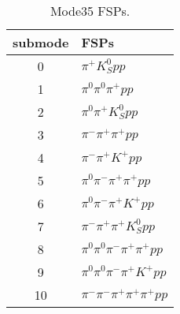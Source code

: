 \begin{table}[h!]
\begin{center}
\begin{tabular}{cl}
\hline
submode& FSPs\\
\hline
0 & $\pi^+ K_S^0 {p} p $ \\
1 & $\pi^0 \pi^0 \pi^+ {p} p $ \\
2 & $\pi^0 \pi^+ K_S^0 {p} p $ \\
3 & $\pi^- \pi^+ \pi^+ {p} p $ \\
4 & $\pi^- \pi^+ K^+ {p} p $ \\
5 & $\pi^0 \pi^- \pi^+ \pi^+ {p} p $ \\
6 & $\pi^0 \pi^- \pi^+ K^+ {p} p $ \\
7 & $\pi^- \pi^+ \pi^+ K_S^0 {p} p $ \\
8 & $\pi^0 \pi^0 \pi^- \pi^+ \pi^+ {p} p $ \\
9 & $\pi^0 \pi^0 \pi^- \pi^+ K^+ {p} p $ \\
10 & $\pi^- \pi^- \pi^+ \pi^+ \pi^+ {p} p $ \\
\hline
\end{tabular}
\label{tab:Mode35FSPs}
\caption{Mode35 FSPs.}
\end{center}
\end{table}
